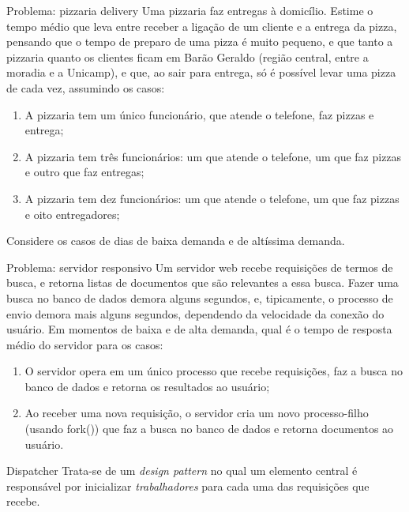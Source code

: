 \documentclass{beamer}
\begin{document}
\begin{frame}[fragile]{Problema: pizzaria delivery}
  \centering
  \large
  Uma pizzaria faz entregas à domicílio. Estime o tempo médio que leva entre
  receber a
  ligação de um cliente e a entrega da pizza, pensando que o tempo de preparo de
  uma pizza é muito pequeno, e que tanto a pizzaria quanto os clientes ficam
  em Barão
  Geraldo (região central, entre a moradia e a Unicamp), e que, ao sair para
  entrega, só é possível levar uma pizza de cada vez, assumindo os casos:
  \begin{enumerate}
    \item A pizzaria tem um único funcionário, que atende o telefone, faz pizzas
      e entrega;
    \item A pizzaria tem três funcionários: um que atende o telefone, um que faz
      pizzas e outro que faz entregas;
    \item A pizzaria tem dez funcionários: um que atende o telefone, um que
      faz pizzas e oito entregadores;
  \end{enumerate}
  Considere os casos de dias de baixa demanda e de altíssima demanda.
\end{frame}

\begin{frame}[fragile]{Problema: servidor responsivo}
  \centering
  \large
  Um servidor web recebe requisições de termos de busca, e retorna listas de
  documentos que são relevantes a essa busca. Fazer uma busca no banco de dados
  demora alguns segundos, e, tipicamente, o processo de envio demora mais alguns
  segundos, dependendo da velocidade da conexão do usuário. Em momentos de baixa
  e de alta demanda, qual é o tempo de resposta médio do servidor para os casos:
  \begin{enumerate}
    \item O servidor opera em um único processo que recebe requisições, faz a
      busca no banco de dados e retorna os resultados ao usuário;
    \item Ao receber uma nova requisição, o servidor cria um novo processo-filho
      (usando fork()) que faz a busca no banco de dados e retorna documentos ao
      usuário.
  \end{enumerate}
\end{frame}

\begin{frame}[fragile]{Dispatcher}
  \centering
  \Large
  Trata-se de um \textit{design pattern} no qual um elemento central é
  responsável por inicializar \textit{trabalhadores} para cada uma das
  requisições que recebe.
\end{frame}
\end{document}
